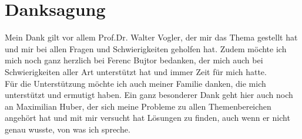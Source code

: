\chapter*{Danksagung}
Mein Dank gilt vor allem Prof.Dr. Walter Vogler, der mir das Thema gestellt hat
und mir bei allen Fragen und Schwierigkeiten geholfen hat. Zudem möchte ich
mich noch ganz herzlich bei Ferenc Bujtor bedanken, der mich auch bei
Schwierigkeiten aller Art unterstützt hat und immer Zeit für mich hatte.\\
Für die Unterstützung möchte ich auch meiner Familie danken, die mich
unterstützt und ermutigt haben. Ein ganz besonderer Dank geht hier auch noch an
Maximilian Huber, der sich meine Probleme zu allen Themenbereichen angehört hat
und mit mir versucht hat Lösungen zu finden, auch wenn er nicht genau wusste,
von was ich spreche.
